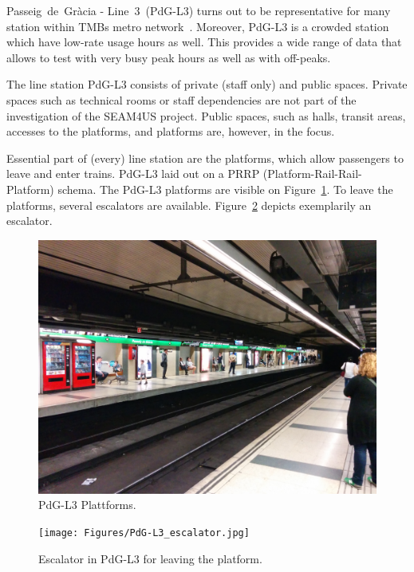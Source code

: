 Passeig~de~Gr\`{a}cia - Line~3~(PdG-L3) turns out to be representative for many station within TMBs metro network~\cite{TMB_2014}. Moreover, PdG-L3 is a crowded station which have low-rate usage hours as well. This provides a wide range of data that allows to test with very busy peak hours as well as with off-peaks.

The line station PdG-L3 consists of private (staff only) and public spaces. Private spaces such as technical rooms or staff dependencies are not part of the investigation of the SEAM4US project. Public spaces, such as halls, transit areas, accesses to the platforms, and platforms are, however, in the focus.

Essential part of (every) line station are the platforms, which allow passengers to leave and enter trains. PdG-L3 laid out on a PRRP (Platform-Rail-Rail-Platform) schema. The PdG-L3 platforms are visible on Figure~\ref{fig:PdG-L3_platforms}. To leave the platforms, several escalators are available. Figure~\ref{fig:PdG-L3_escalator} depicts exemplarily an escalator.

\begin{figure}[htbp]
  \centering
  \includegraphics[width=\linewidth]{Figures/PdG-L3_platform.jpg} 
  \caption{PdG-L3 Plattforms. \cite{TMB_2014}}
  \label{fig:PdG-L3_platforms}
\end{figure}

\begin{figure}[htbp]
  \centering
  \texttt{[image: Figures/PdG-L3\_escalator.jpg]} 
  \caption{Escalator in PdG-L3 for leaving the platform. \cite{TMB_2014}}
  \label{fig:PdG-L3_escalator}
\end{figure}

